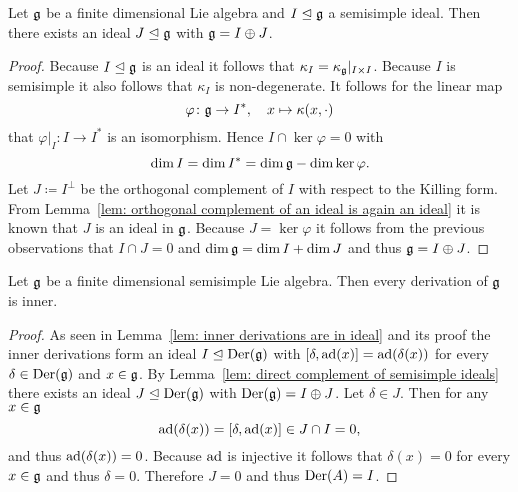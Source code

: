 \begin{lemma}\label{lem: direct complement of semisimple ideals}
 Let $\mathfrak{g}$ be a finite dimensional Lie algebra and $I \trianglelefteq \mathfrak{g}$ a semisimple ideal. Then there exists an ideal $J \trianglelefteq \mathfrak{g}$ with $\mathfrak{g} = I \oplus J$.
\end{lemma}
\begin{proof}
 Because $I \trianglelefteq \mathfrak{g}$ is an ideal it follows that $\kappa_I = \kappa_{\mathfrak{g}}|_{I \times I}$. Because $I$ is semisimple it also follows that $\kappa_I$ is non-degenerate. It follows for the linear map
 \[
  \varphi \colon \mathfrak{g} \to I^*, \quad x \mapsto \kappa(x, \cdot)
 \]
 that $\varphi|_I \colon I \to I^*$ is an isomorphism. Hence $I \cap \ker \varphi = 0$ with
 \[
  \dim I = \dim I^* = \dim \mathfrak{g} - \dim \ker \varphi.
 \]
 Let $J \coloneqq I^\perp$ be the orthogonal complement of $I$ with respect to the Killing form. From Lemma~\ref{lem: orthogonal complement of an ideal is again an ideal} it is known that $J$ is an ideal in $\mathfrak{g}$. Because $J = \ker \varphi$ it follows from the previous observations that $I \cap J = 0$ and $\dim \mathfrak{g} = \dim I + \dim J$ and thus $\mathfrak{g} = I \oplus J$.
\end{proof}


\begin{lemma}\label{lem: every derivation of a semisimple Lie algebra is inner}
 Let $\mathfrak{g}$ be a finite dimensional semisimple Lie algebra. Then every derivation of $\mathfrak{g}$ is inner.
\end{lemma}
\begin{proof}
 As seen in Lemma~\ref{lem: inner derivations are in ideal} and its proof the inner derivations form an ideal $I \trianglelefteq \operatorname{Der}(\mathfrak{g})$ with $[\delta,\operatorname{ad}(x)] = \operatorname{ad}(\delta(x))$ for every $\delta \in \operatorname{Der}(\mathfrak{g})$ and $x \in \mathfrak{g}$. By Lemma~\ref{lem: direct complement of semisimple ideals} there exists an ideal $J \trianglelefteq \operatorname{Der}(\mathfrak{g})$ with $\operatorname{Der}(\mathfrak{g}) = I \oplus J$. Let $\delta \in J$. Then for any $x \in \mathfrak{g}$
 \[
  \operatorname{ad}(\delta(x)) = [\delta, \operatorname{ad}(x)] \in J \cap I = 0,
 \]
 and thus $\operatorname{ad}(\delta(x)) = 0$. Because $\operatorname{ad}$ is injective it follows that $\delta(x) = 0$ for every $x \in \mathfrak{g}$ and thus $\delta = 0$. Therefore $J = 0$ and thus $\operatorname{Der}(A) = I$.
\end{proof}


